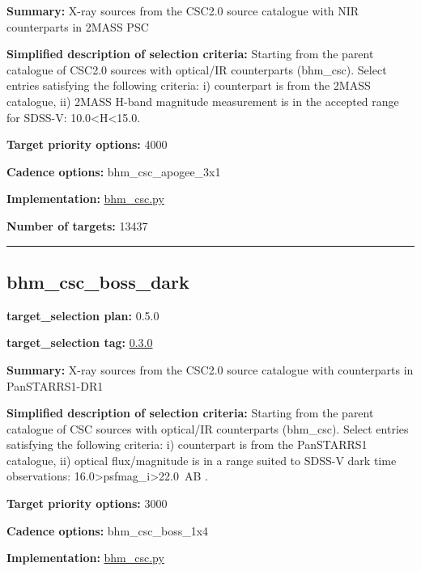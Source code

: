 \noindent\textbf{Summary:} X-ray sources from the CSC2.0 source catalogue with
NIR counterparts in 2MASS PSC

\noindent\textbf{Simplified description of selection criteria:} Starting from the
parent catalogue of CSC2.0 sources with optical/IR counterparts
(bhm\_csc). Select entries satisfying the following criteria: i)
counterpart is from the 2MASS catalogue, ii) 2MASS H-band magnitude
measurement is in the accepted range for SDSS-V:
10.0\textless H\textless15.0.


\noindent\textbf{Target priority options:} 4000

\noindent\textbf{Cadence options:} bhm\_csc\_apogee\_3x1

\noindent\textbf{Implementation:}
\href{https://github.com/sdss/target_selection/blob/0.3.0/python/target_selection/cartons/bhm_csc.py}{bhm\_csc.py}

\noindent\textbf{Number of targets:} 13437

\begin{center}\rule{0.5\linewidth}{0.5pt}\end{center}

\hypertarget{bhm_csc_boss_dark_plan0.5.0}{%
\subsection{bhm\_csc\_boss\_dark}\label{bhm_csc_boss_dark_plan0.5.0}}

\noindent\textbf{target\_selection plan:} 0.5.0

\noindent\textbf{target\_selection tag:}
\href{https://github.com/sdss/target_selection/tree/0.3.0/}{0.3.0}

\noindent\textbf{Summary:} X-ray sources from the CSC2.0 source catalogue with
counterparts in PanSTARRS1-DR1

\noindent\textbf{Simplified description of selection criteria:} Starting from the
parent catalogue of CSC sources with optical/IR counterparts (bhm\_csc).
Select entries satisfying the following criteria: i) counterpart is from
the PanSTARRS1 catalogue, ii) optical flux/magnitude is in a range
suited to SDSS-V dark time observations:
16.0\textgreater psfmag\_i\textgreater22.0~AB .


\noindent\textbf{Target priority options:} 3000

\noindent\textbf{Cadence options:} bhm\_csc\_boss\_1x4

\noindent\textbf{Implementation:}
\href{https://github.com/sdss/target_selection/blob/0.3.0/python/target_selection/cartons/bhm_csc.py}{bhm\_csc.py}

